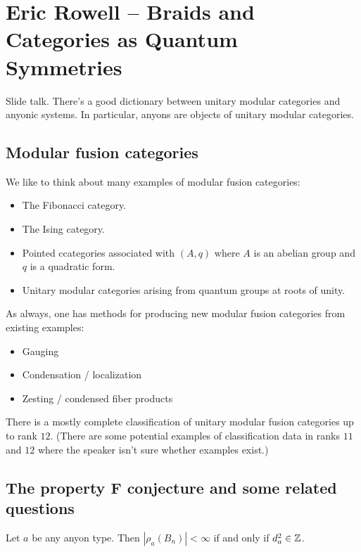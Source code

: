 \documentclass{amsart}
\begin{document}
\section{Eric Rowell -- Braids and Categories as Quantum Symmetries}

Slide talk.
There's a good dictionary between unitary modular categories and anyonic systems.
In particular, anyons are objects of unitary modular categories.

\subsection{Modular fusion categories}

We like to think about many examples of modular fusion categories:
\begin{itemize}
  \item The Fibonacci category.
  \item The Ising category.
  \item Pointed ccategories associated with $(A, q)$ where $A$ is an abelian group and $q$ is a quadratic form.
  \item Unitary modular categories arising from quantum groups at roots of unity.
\end{itemize}

As always, one has methods for producing new modular fusion categories from existing examples:
\begin{itemize}
  \item Gauging
  \item Condensation / localization
  \item Zesting / condensed fiber products
\end{itemize}

There is a mostly complete classification of unitary modular fusion categories up to rank $12$.
(There are some potential examples of classification data in ranks $11$ and $12$ where the speaker isn't sure whether examples exist.)

\subsection{The property F conjecture and some related questions}

\begin{conj}
  Let $a$ be any anyon type.
  Then $|\rho_a(B_n)| < \infty$ if and only if $d_a^2 \in \mathbb{Z}$.
\end{conj}
\end{document}
